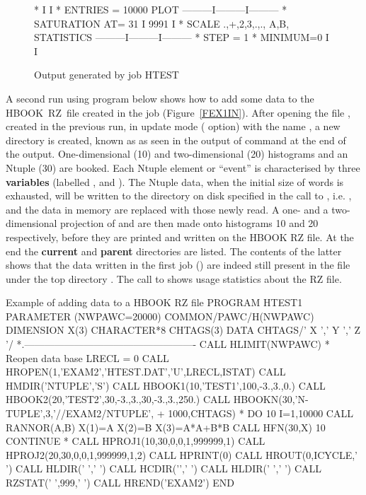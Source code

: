 \begin{figure}[p]
\begin{XMPfrac}{3.3}
 *                                                          I         I
 * ENTRIES =    10000                   PLOT       ---------I---------I---------
 * SATURATION  AT=           31                             I 9991    I
 * SCALE  .,+,2,3,.,., A,B,           STATISTICS   ---------I---------I---------
 * STEP =    1     * MINIMUM=0                              I         I
\end{XMPfrac}
\NODOC{\end{minipage}}
\caption{Output generated by job HTEST}
\label{FEX1OU}
\end{figure}
\clearpage


A second run using program  below shows
how to add some data to the HBOOK~RZ~file
created in the job  (Figure~\ref{FEX1IN}). 
After opening the file , created in the previous run,
in update mode ( option) with the
name , a new directory  is created,
known as  as seen in the output of
 command at the end of the output.
One-dimensional (10) and two-dimensional (20) histograms
and an Ntuple (30) are booked.
Each Ntuple element or ``event''
is characterised by three {\bf variables}
(labelled ,  and ).
The Ntuple data, when the initial size of 
words is exhausted, will be written to the directory on disk
specified in the
call to , i.e. ,
and the data in memory are replaced with those newly read.
A one- and a two-dimensional projection
of  and  are then made onto histograms
10 and 20 respectively, before they are printed and written on the
HBOOK RZ file. At the end the {\bf current} and {\bf parent}
directories are listed.
The contents of the latter shows that the data written in
the first job () are indeed still present in the file
under the top directory .
The call to  shows usage statistics about the RZ file.

\begin{XMPt}{Example of adding data to a HBOOK RZ file}
      PROGRAM HTEST1
      PARAMETER (NWPAWC=20000)
      COMMON/PAWC/H(NWPAWC)
      DIMENSION X(3)
      CHARACTER*8 CHTAGS(3)
      DATA CHTAGS/'   X   ','   Y   ','   Z   '/
*.----------------------------------------------------
      CALL HLIMIT(NWPAWC)
*             Reopen data base
      LRECL = 0
      CALL HROPEN(1,'EXAM2','HTEST.DAT','U',LRECL,ISTAT)
      CALL HMDIR('NTUPLE','S')
      CALL HBOOK1(10,'TEST1',100,-3.,3.,0.)
      CALL HBOOK2(20,'TEST2',30,-3.,3.,30,-3.,3.,250.)
      CALL HBOOKN(30,'N-TUPLE',3,'//EXAM2/NTUPLE',
     +            1000,CHTAGS)
*
      DO 10 I=1,10000
         CALL RANNOR(A,B)
         X(1)=A
         X(2)=B
         X(3)=A*A+B*B
         CALL HFN(30,X)
  10  CONTINUE
*
      CALL HPROJ1(10,30,0,0,1,999999,1)
      CALL HPROJ2(20,30,0,0,1,999999,1,2)
      CALL HPRINT(0)
      CALL HROUT(0,ICYCLE,' ')
      CALL HLDIR(' ',' ')
      CALL HCDIR('\bs',' ')
      CALL HLDIR(' ',' ')
      CALL RZSTAT(' ',999,' ')
      CALL HREND('EXAM2')
      END
\end{XMPt}


